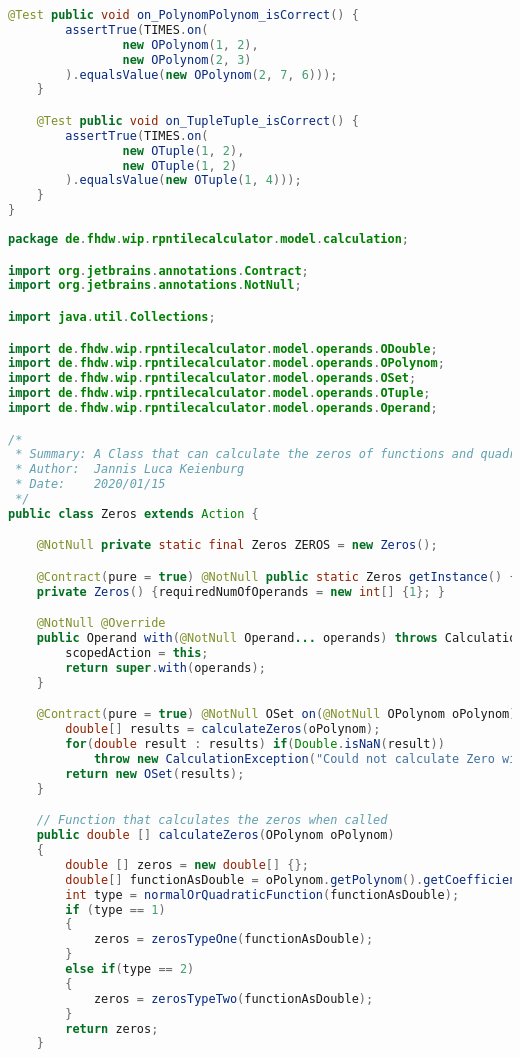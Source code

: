 \begin{lstlisting}[caption=TimesTest (Schwenke),label=list:TimesTest,language=Java]
    @Test public void on_PolynomPolynom_isCorrect() {
        assertTrue(TIMES.on(
                new OPolynom(1, 2),
                new OPolynom(2, 3)
        ).equalsValue(new OPolynom(2, 7, 6)));
    }

    @Test public void on_TupleTuple_isCorrect() {
        assertTrue(TIMES.on(
                new OTuple(1, 2),
                new OTuple(1, 2)
        ).equalsValue(new OTuple(1, 4)));
    }
}
\end{lstlisting}

\begin{lstlisting}[caption=Zeros (Keienburg),label=list:Zeros,language=Java]
package de.fhdw.wip.rpntilecalculator.model.calculation;

import org.jetbrains.annotations.Contract;
import org.jetbrains.annotations.NotNull;

import java.util.Collections;

import de.fhdw.wip.rpntilecalculator.model.operands.ODouble;
import de.fhdw.wip.rpntilecalculator.model.operands.OPolynom;
import de.fhdw.wip.rpntilecalculator.model.operands.OSet;
import de.fhdw.wip.rpntilecalculator.model.operands.OTuple;
import de.fhdw.wip.rpntilecalculator.model.operands.Operand;

/*
 * Summary: A Class that can calculate the zeros of functions and quadratic functions.
 * Author:  Jannis Luca Keienburg
 * Date:    2020/01/15
 */
public class Zeros extends Action {

    @NotNull private static final Zeros ZEROS = new Zeros();

    @Contract(pure = true) @NotNull public static Zeros getInstance() { return ZEROS; }
    private Zeros() {requiredNumOfOperands = new int[] {1}; }

    @NotNull @Override
    public Operand with(@NotNull Operand... operands) throws CalculationException {
        scopedAction = this;
        return super.with(operands);
    }

    @Contract(pure = true) @NotNull OSet on(@NotNull OPolynom oPolynom) throws CalculationException {
        double[] results = calculateZeros(oPolynom);
        for(double result : results) if(Double.isNaN(result))
            throw new CalculationException("Could not calculate Zero with " + result);
        return new OSet(results);
    }

    // Function that calculates the zeros when called
    public double [] calculateZeros(OPolynom oPolynom)
    {
        double [] zeros = new double[] {};
        double[] functionAsDouble = oPolynom.getPolynom().getCoefficients();
        int type = normalOrQuadraticFunction(functionAsDouble);
        if (type == 1)
        {
            zeros = zerosTypeOne(functionAsDouble);
        }
        else if(type == 2)
        {
            zeros = zerosTypeTwo(functionAsDouble);
        }
        return zeros;
    }


\end{lstlisting}
